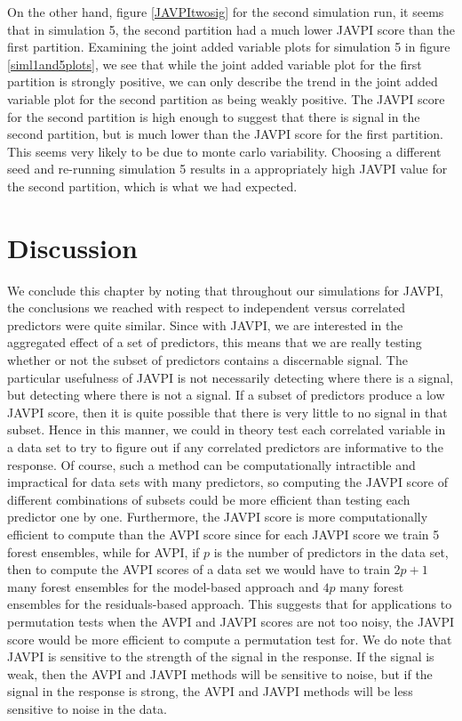 \documentclass[12pt,twoside]{reedthesis}
\theoremstyle{definition}
\theoremstyle{definition}
\theoremstyle{definition}
\theoremstyle{remark}
\begin{document}
On the other hand, figure \ref{JAVPItwosig} for the second simulation
run, it seems that in simulation 5, the second partition had a much
lower JAVPI score than the first partition. Examining the joint added
variable plots for simulation 5 in figure \ref{siml1and5plots}, we see
that while the joint added variable plot for the first partition is
strongly positive, we can only describe the trend in the joint added
variable plot for the second partition as being weakly positive. The
JAVPI score for the second partition is high enough to suggest that
there is signal in the second partition, but is much lower than the
JAVPI score for the first partition. This seems very likely to be due to
monte carlo variability. Choosing a different seed and re-running
simulation 5 results in a appropriately high JAVPI value for the second
partition, which is what we had expected. \par 

\section{Discussion}\label{discussion}

We conclude this chapter by noting that throughout our simulations for
JAVPI, the conclusions we reached with respect to independent versus
correlated predictors were quite similar. Since with JAVPI, we are
interested in the aggregated effect of a set of predictors, this means
that we are really testing whether or not the subset of predictors
contains a discernable signal. The particular usefulness of JAVPI is not
necessarily detecting where there is a signal, but detecting where there
is not a signal. If a subset of predictors produce a low JAVPI score,
then it is quite possible that there is very little to no signal in that
subset. Hence in this manner, we could in theory test each correlated
variable in a data set to try to figure out if any correlated predictors
are informative to the response. Of course, such a method can be
computationally intractible and impractical for data sets with many
predictors, so computing the JAVPI score of different combinations of
subsets could be more efficient than testing each predictor one by one.
Furthermore, the JAVPI score is more computationally efficient to
compute than the AVPI score since for each JAVPI score we train 5 forest
ensembles, while for AVPI, if \(p\) is the number of predictors in the
data set, then to compute the AVPI scores of a data set we would have to
train \(2p+1\) many forest ensembles for the model-based approach and
\(4p\) many forest ensembles for the residuals-based approach. This
suggests that for applications to permutation tests when the AVPI and
JAVPI scores are not too noisy, the JAVPI score would be more efficient
to compute a permutation test for. We do note that JAVPI is sensitive to
the strength of the signal in the response. If the signal is weak, then
the AVPI and JAVPI methods will be sensitive to noise, but if the signal
in the response is strong, the AVPI and JAVPI methods will be less
sensitive to noise in the data. \par 
\end{document}
